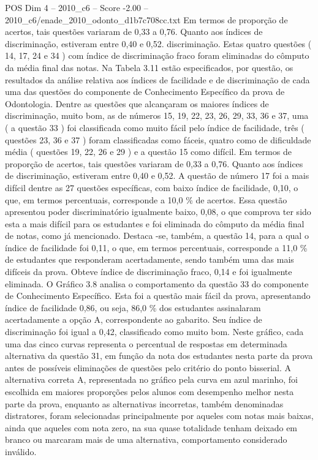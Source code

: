 \begin{textsample}{POS Dim 4 – 2010\_c6 – Score -2.00 – 2010\_c6/enade\_2010\_odonto\_d1b7c708cc.txt}
Em termos de proporção de acertos, tais questões variaram de 0,33 a 0,76.
Quanto aos índices de discriminação, estiveram entre 0,40 e 0,52. discriminação.
Estas quatro questões ( 14, 17, 24 e 34 ) com índice de discriminação fraco foram eliminadas do cômputo da média final das notas.
Na Tabela 3.11 estão especificados, por questão, os resultados da análise relativa aos índices de facilidade e de discriminação de cada uma das questões do componente de Conhecimento Específico da prova de Odontologia.
Dentre as questões que alcançaram os maiores índices de discriminação, muito bom, as de números 15, 19, 22, 23, 26, 29, 33, 36 e 37, uma ( a questão 33 ) foi classificada como muito fácil pelo índice de facilidade, três ( questões 23, 36 e 37 ) foram classificadas como fáceis, quatro como de dificuldade média ( questões 19, 22, 26 e 29 ) e a questão 15 como difícil.
Em termos de proporção de acertos, tais questões variaram de 0,33 a 0,76.
Quanto aos índices de discriminação, estiveram entre 0,40 e 0,52.
A questão de número 17 foi a mais difícil dentre as 27 questões específicas, com baixo índice de facilidade, 0,10, o que, em termos percentuais, corresponde a 10,0 \% de acertos.
Essa questão apresentou poder discriminatório igualmente baixo, 0,08, o que comprova ter sido esta a mais difícil para os estudantes e foi eliminada do cômputo da média final de notas, como já mencionado.
Destaca -se, também, a questão 14, para a qual o índice de facilidade foi 0,11, o que, em termos percentuais, corresponde a 11,0 \% de estudantes que responderam acertadamente, sendo também uma das mais difíceis da prova.
Obteve índice de discriminação fraco, 0,14 e foi igualmente eliminada.
O Gráfico 3.8 analisa o comportamento da questão 33 do componente de Conhecimento Específico.
Esta foi a questão mais fácil da prova, apresentando índice de facilidade 0,86, ou seja, 86,0 \% dos estudantes assinalaram acertadamente a opção A, correspondente ao gabarito.
Seu índice de discriminação foi igual a 0,42, classificado como muito bom.
Neste gráfico, cada uma das cinco curvas representa o percentual de respostas em determinada alternativa da questão 31, em função da nota dos estudantes nesta parte da prova antes de possíveis eliminações de questões pelo critério do ponto bisserial.
A alternativa correta A, representada no gráfico pela curva em azul marinho, foi escolhida em maiores proporções pelos alunos com desempenho melhor nesta parte da prova, enquanto as alternativas incorretas, também denominadas distratores, foram selecionadas principalmente por aqueles com notas mais baixas, ainda que aqueles com nota zero, na sua quase totalidade tenham deixado em branco ou marcaram mais de uma alternativa, comportamento considerado inválido.

\end{textsample}
